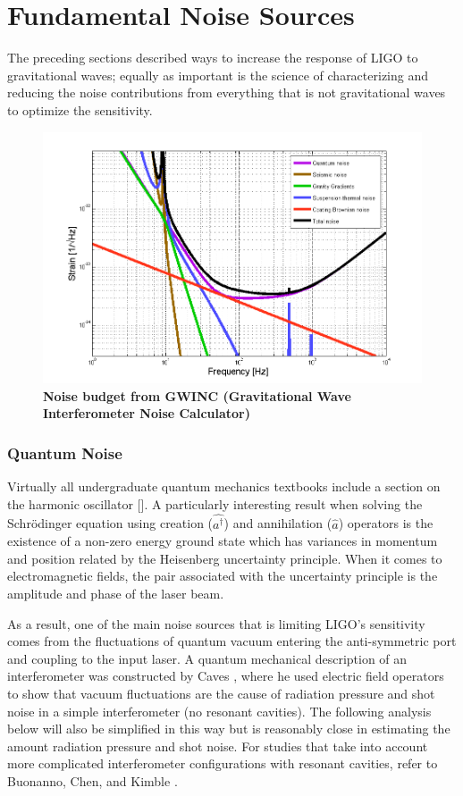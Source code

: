		\section{Fundamental Noise Sources}\label{funnoise}
		The preceding sections described ways to increase the response of LIGO to gravitational waves; equally as important is the science of characterizing and reducing the noise contributions from everything that is not gravitational waves to optimize the sensitivity.
		
		\begin{figure}[ht]
			\centering
			\includegraphics[width=0.8 \textwidth]{../Figures/BasicNB.png}
			\caption[Noise budget from GWINC (Gravitational Wave Interferometer Noise Calculator)]
			{\textbf{Noise budget from GWINC (Gravitational Wave Interferometer Noise Calculator)}
			}
			\label{fig:GWINC}
		\end{figure}
		
		\subsubsection{Quantum Noise}\label{Sec:QuantumNoise}
		Virtually all undergraduate quantum mechanics textbooks include a section on the harmonic oscillator [\cite{Shankar}].  A particularly interesting result when solving the Schrödinger equation using creation ($\hat{a^{\dagger}}$) and annihilation ($\hat{a}$) operators is the existence of a non-zero energy ground state which has variances in momentum and position related by the Heisenberg uncertainty principle.  When it comes to electromagnetic fields, the pair associated with the uncertainty principle is the amplitude and phase of the laser beam.
		
		As a result, one of the main noise sources that is limiting LIGO's sensitivity comes from the fluctuations of quantum vacuum entering the anti-symmetric port and coupling to the input laser. A quantum mechanical description of an interferometer was constructed by Caves \cite{CavesQMNoise}\cite{Caves2photon} \cite{CavesOscillator}, where he used electric field operators to show that vacuum fluctuations are the cause of radiation pressure and shot noise in a simple interferometer (no resonant cavities).  The following analysis below will also be simplified in this way but is reasonably close in estimating the amount radiation pressure and shot noise.  For studies that take into account more complicated interferometer configurations with resonant cavities, refer to Buonanno, Chen, and Kimble \cite{BuonannoChenQMNoise} \cite{ChenQND} \cite{KimbleConversion}.
		
